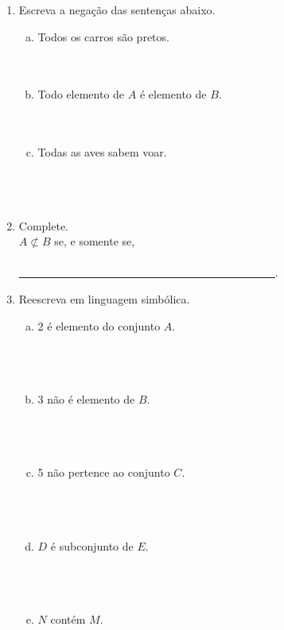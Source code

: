 \documentclass[a4paper,14pt]{article}
\begin{document}
\begin{multicols}{2}
\begin{enumerate}
\begin{enumerate}[a)]
			\end{enumerate}
			\item Escreva a negação das sentenças abaixo.
			\begin{enumerate}[a)]
				\item Todos os carros são pretos. \\\\\\
				\item Todo elemento de $A$ é elemento de $B$. \\\\\\
				\item Todas as aves sabem voar. \\\\\\\\
			\end{enumerate}
			\item Complete. \\
			$A \not\subset B$ se, e somente se, \\\\ \underline{~~~~~~~~~~~~~~~~~~~~~~~~~~~~~~~~~~~~~~~~~~~~~~}.
			\item Reescreva em linguagem simbólica.
			\begin{enumerate}[a)]
				\item 2 é elemento do conjunto $A$. \\\\\\\\
				\item 3 não é elemento de $B$. \\\\\\\\
				\item 5 não pertence ao conjunto $C$. \\\\\\\\
				\item $D$ é subconjunto de $E$. \\\\\\\\
				\item $N$ contém $M$. \\\\\\\\

\end{enumerate}
\end{enumerate}
\end{multicols}
\end{document}
